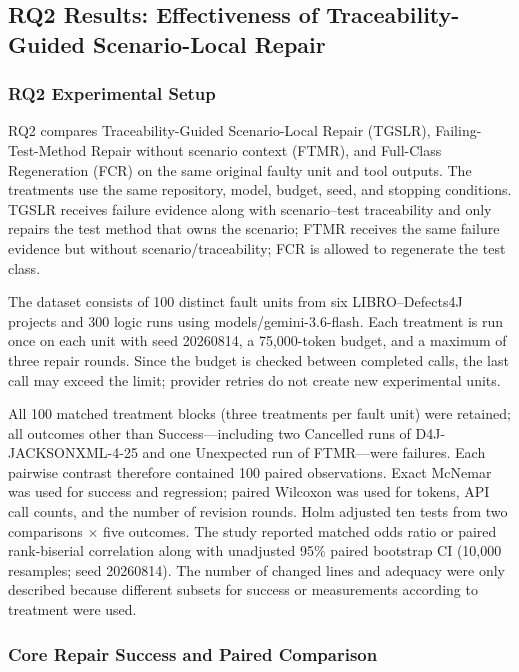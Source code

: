 \documentclass[pdflatex,sn-basic,Numbered,iicol]{sn-jnl}
\begin{document}
\subsection{RQ2 Results: Effectiveness of Traceability-Guided Scenario-Local Repair}\label{subsec:rq2}

\subsubsection{RQ2 Experimental Setup}\label{subsubsec:rq2-setup}

RQ2 compares Traceability-Guided Scenario-Local Repair (TGSLR), Failing-Test-Method Repair without scenario context (FTMR), and Full-Class Regeneration (FCR) on the same original faulty unit and tool outputs. The treatments use the same repository, model, budget, seed, and stopping conditions. TGSLR receives failure evidence along with scenario--test traceability and only repairs the test method that owns the scenario; FTMR receives the same failure evidence but without scenario/traceability; FCR is allowed to regenerate the test class.

The dataset consists of 100 distinct fault units from six LIBRO--Defects4J projects and 300 logic runs using models/gemini-3.6-flash. Each treatment is run once on each unit with seed 20260814, a 75,000-token budget, and a maximum of three repair rounds. Since the budget is checked between completed calls, the last call may exceed the limit; provider retries do not create new experimental units.

All 100 matched treatment blocks (three treatments per fault unit) were retained; all outcomes other than Success---including two Cancelled runs of D4J-JACKSONXML-4-25 and one Unexpected run of FTMR---were failures. Each pairwise contrast therefore contained 100 paired observations. Exact McNemar was used for success and regression; paired Wilcoxon was used for tokens, API call counts, and the number of revision rounds. Holm adjusted ten tests from two comparisons \ensuremath{\times} five outcomes. The study reported matched odds ratio or paired rank-biserial correlation along with unadjusted 95\% paired bootstrap CI (10,000 resamples; seed 20260814). The number of changed lines and adequacy were only described because different subsets for success or measurements according to treatment were used.

\subsubsection{Core Repair Success and Paired Comparison}\label{subsubsec:rq2-success}
\end{document}
